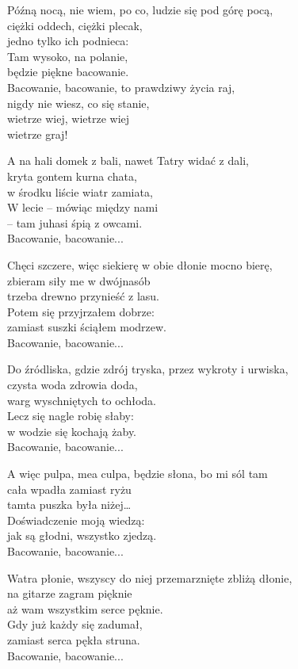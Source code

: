 \begin{text}
    Późną nocą, nie wiem, po co, ludzie się pod górę pocą,\\
    ciężki oddech, ciężki plecak,\\
    jedno tylko ich podnieca:\\
    Tam wysoko, na polanie,\\
    będzie piękne bacowanie.\\
    \vin Bacowanie, bacowanie, to prawdziwy życia raj,\\
    \vin nigdy nie wiesz, co się stanie,\\
    \vin wietrze wiej, wietrze wiej\\
    \vin wietrze graj!

    A na hali domek z bali, nawet Tatry widać z dali,\\
    kryta gontem kurna chata,\\
    w środku liście wiatr zamiata,\\
    W lecie – mówiąc między nami\\
    – tam juhasi śpią z owcami.\\
    \vin Bacowanie, bacowanie...

    Chęci szczere, więc siekierę w obie dłonie mocno bierę,\\
    zbieram siły me w dwójnasób\\
    trzeba drewno przynieść z lasu.\\
    Potem się przyjrzałem dobrze:\\
    zamiast suszki ściąłem modrzew.\\
    \vin Bacowanie, bacowanie...

    Do źródliska, gdzie zdrój tryska, przez wykroty i urwiska,\\
    czysta woda zdrowia doda,\\
    warg wyschniętych to ochłoda.\\
    Lecz się nagle robię słaby:\\
    w wodzie się kochają żaby.\\
    \vin Bacowanie, bacowanie...

    A więc pulpa, mea culpa, będzie słona, bo mi sól tam\\
    cała wpadła zamiast ryżu\\
    tamta puszka była niżej…\\
    Doświadczenie moją wiedzą:\\
    jak są głodni, wszystko zjedzą.\\
    \vin Bacowanie, bacowanie...

    Watra płonie, wszyscy do niej przemarznięte zbliżą dłonie,\\
    na gitarze zagram pięknie\\
    aż wam wszystkim serce pęknie.\\
    Gdy już każdy się zadumał,\\
    zamiast serca pękła struna.\\
    \vin Bacowanie, bacowanie...
\end{text}
